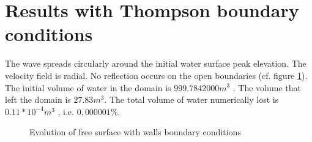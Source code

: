 \section{Results with Thompson boundary conditions}

The wave spreads circularly around the initial water surface peak elevation.
The velocity field is radial. No reflection occurs on the open boundaries (cf. figure \ref{t2d:gouttedo:thompson_evol}).
The initial volume of water in the domain is $999.784 2000 m^3$ . The volume that left the domain is $27.83 m^3$.
The total volume of water numerically lost is $0.11* 10^{-4} m^3$ , i.e. $0,000001\%$.

\begin{figure}[H]
\begin{minipage}[t]{0.50\textwidth}
 \centering
\end{minipage}%
\begin{minipage}[t]{0.50\textwidth}
 \centering
\end{minipage}
\begin{minipage}[t]{0.50\textwidth}
 \centering
\end{minipage}%
\begin{minipage}[t]{0.50\textwidth}
 \centering
\end{minipage}
\begin{minipage}[t]{0.50\textwidth}
 \centering
\end{minipage}%
\begin{minipage}[t]{0.50\textwidth}
 \centering
\end{minipage}
\begin{minipage}[t]{0.50\textwidth}
 \centering
\end{minipage}%
\begin{minipage}[t]{0.50\textwidth}
 \centering
\end{minipage}
\caption{Evolution of free surface with walls boundary conditions}
\label{t2d:gouttedo:thompson_evol}
\end{figure}


